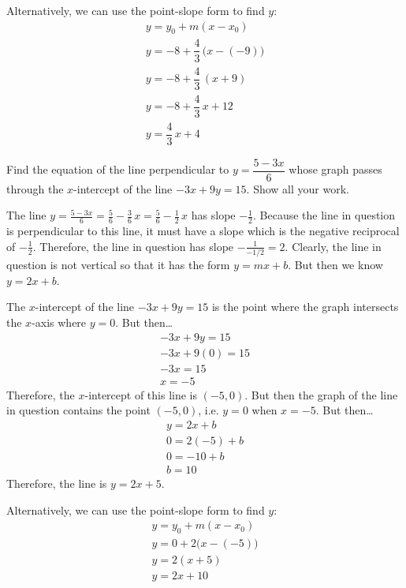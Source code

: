 \documentclass[12pt,letterpaper]{exam}
\begin{document}
\begin{questions}
Alternatively, we can use the point-slope form to find $y$:
	\[
	\begin{gathered}
	y= y_0 + m(x - x_0) \\
	y= -8 + \dfrac{4}{3} \, \big(x - (-9) \big) \\
	y= -8 + \dfrac{4}{3} \, (x + 9) \\
	y= -8 + \dfrac{4}{3} \, x + 12 \\
	y= \dfrac{4}{3} \, x + 4
	\end{gathered}
	\]



\newpage
\question[10] Find the equation of the line perpendicular to $y= \dfrac{5 - 3x}{6}$ whose graph passes through the $x$-intercept of the line $-3x + 9y= 15$. Show all your work. \pspace

\sol The line $y= \frac{5 - 3x}{6}= \frac{5}{6} - \frac{3}{6}\,x= \frac{5}{6} - \frac{1}{2}\, x$ has slope $-\frac{1}{2}$. Because the line in question is perpendicular to this line, it must have a slope which is the negative reciprocal of $-\frac{1}{2}$. Therefore, the line in question has slope $-\frac{1}{-1/2}= 2$. Clearly, the line in question is not vertical so that it has the form $y= mx + b$. But then we know $y= 2x + b$. \pspace

The $x$-intercept of the line $-3x + 9y= 15$ is the point where the graph intersects the $x$-axis where $y= 0$. But then\dots
	\[
	\begin{aligned}
	-3x + 9y= 15 \\
	-3x + 9(0)= 15 \\
	-3x= 15 \\
	x= -5
	\end{aligned}
	\]
Therefore, the $x$-intercept of this line is $(-5, 0)$. But then the graph of the line in question contains the point $(-5, 0)$, i.e. $y= 0$ when $x= -5$. But then\dots
	\[
	\begin{gathered}
	y= 2x + b \\
	0= 2(-5) + b \\
	0= -10 + b \\
	b= 10
	\end{gathered}
	\]
Therefore, the line is $y= 2x + 5$. \pspace

Alternatively, we can use the point-slope form to find $y$:
	\[
	\begin{gathered}
	y= y_0 + m(x - x_0) \\
	y= 0 + 2 \big(x - (-5) \big) \\
	y= 2(x + 5) \\
	y= 2x + 10
	\end{gathered}
	\]


\end{questions}
\end{document}
